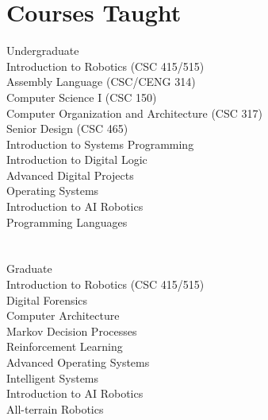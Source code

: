 \documentclass[12pt]{resume}
\begin{document}
\section{Courses Taught}{Undergraduate}
        {\\
          \hspace*{1em} Introduction to Robotics (CSC 415/515)\\
          \hspace*{1em} Assembly Language (CSC/CENG 314)\\
          \hspace*{1em} Computer Science I (CSC 150)\\
          \hspace*{1em} Computer Organization and Architecture (CSC 317)\\
          \hspace*{1em} Senior Design (CSC 465)\\
\hspace*{1em} Introduction to Systems Programming\\
\hspace*{1em} Introduction to Digital Logic\\
\hspace*{1em} Advanced Digital Projects\\
\hspace*{1em} Operating Systems\\
\hspace*{1em} Introduction to AI Robotics\\
\hspace*{1em} Programming Languages
}

\section{}{Graduate}
{\\
  \hspace*{1em} Introduction to Robotics (CSC 415/515)\\
\hspace*{1em} Digital Forensics\\
\hspace*{1em} Computer Architecture\\
\hspace*{1em} Markov Decision Processes\\
\hspace*{1em} Reinforcement Learning\\
\hspace*{1em} Advanced Operating Systems\\
\hspace*{1em} Intelligent Systems\\
\hspace*{1em} Introduction to AI Robotics\\
\hspace*{1em} All-terrain Robotics
}
\end{document}
